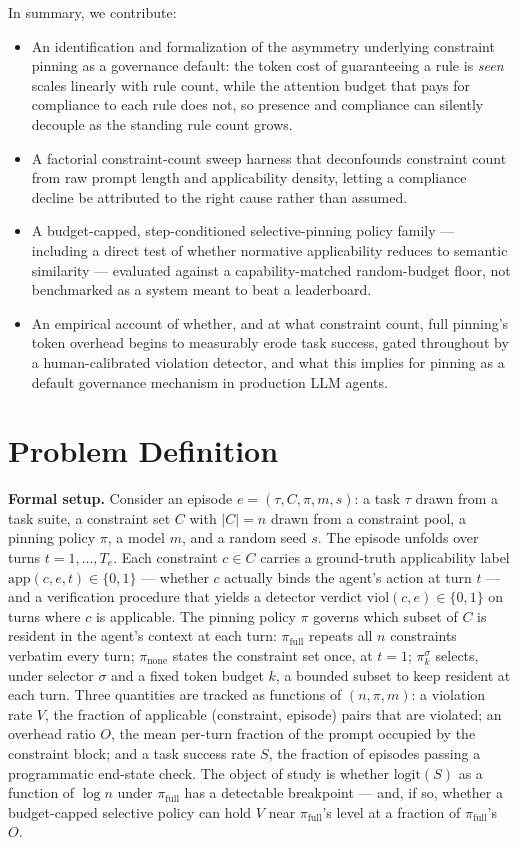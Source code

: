 \documentclass[11pt]{article}
\begin{document}
In summary, we contribute:
\begin{itemize}[leftmargin=1.4em]
\item An identification and formalization of the asymmetry underlying constraint pinning as a governance default: the token cost of guaranteeing a rule is \emph{seen} scales linearly with rule count, while the attention budget that pays for compliance to each rule does not, so presence and compliance can silently decouple as the standing rule count grows.
\item A factorial constraint-count sweep harness that deconfounds constraint count from raw prompt length and applicability density, letting a compliance decline be attributed to the right cause rather than assumed.
\item A budget-capped, step-conditioned selective-pinning policy family --- including a direct test of whether normative applicability reduces to semantic similarity --- evaluated against a capability-matched random-budget floor, not benchmarked as a system meant to beat a leaderboard.
\item An empirical account of whether, and at what constraint count, full pinning's token overhead begins to measurably erode task success, gated throughout by a human-calibrated violation detector, and what this implies for pinning as a default governance mechanism in production LLM agents.
\end{itemize}

\section{Problem Definition}

\noindent\textbf{Formal setup.} Consider an episode $e = (\tau, C, \pi, m, s)$: a task $\tau$ drawn from a task suite, a constraint set $C$ with $|C| = n$ drawn from a constraint pool, a pinning policy $\pi$, a model $m$, and a random seed $s$. The episode unfolds over turns $t = 1,\dots,T_e$. Each constraint $c \in C$ carries a ground-truth applicability label $\mathrm{app}(c,e,t) \in \{0,1\}$ --- whether $c$ actually binds the agent's action at turn $t$ --- and a verification procedure that yields a detector verdict $\mathrm{viol}(c,e) \in \{0,1\}$ on turns where $c$ is applicable. The pinning policy $\pi$ governs which subset of $C$ is resident in the agent's context at each turn: $\pi_{\text{full}}$ repeats all $n$ constraints verbatim every turn; $\pi_{\text{none}}$ states the constraint set once, at $t=1$; $\pi_k^{\sigma}$ selects, under selector $\sigma$ and a fixed token budget $k$, a bounded subset to keep resident at each turn. Three quantities are tracked as functions of $(n, \pi, m)$: a violation rate $V$, the fraction of applicable (constraint, episode) pairs that are violated; an overhead ratio $O$, the mean per-turn fraction of the prompt occupied by the constraint block; and a task success rate $S$, the fraction of episodes passing a programmatic end-state check. The object of study is whether $\mathrm{logit}(S)$ as a function of $\log n$ under $\pi_{\text{full}}$ has a detectable breakpoint --- and, if so, whether a budget-capped selective policy can hold $V$ near $\pi_{\text{full}}$'s level at a fraction of $\pi_{\text{full}}$'s $O$.
\end{document}
